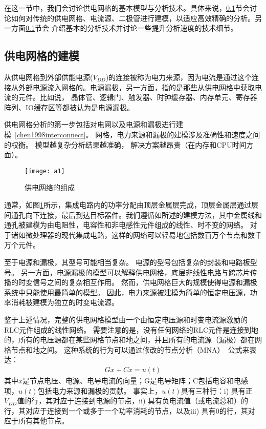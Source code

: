 在这一节中，我们会讨论供电网格的基本模型与分析技术。具体来说，\ref{}节会讨论如何对传统的供电网格、电流源、二极管进行建模，以适应高效精确的分析。另一方面\ref{}节会
介绍基本的分析技术并讨论一些提升分析速度的技术细节。

\subsection{供电网格的建模}


从供电网格到外部供能电源($V_{DD}$)的连接被称为电力来源，因为电流是通过这个连接从外部电源流入网格的。电源漏极，另一方面，指的是那些从供电网格中获取电流的元件。比如说，
晶体管、逻辑门、触发器、时钟缓存器、内存单元、寄存器阵列、IO缓存区等都被认为是电源漏极。

供电网格分析的第一步包括对电网以及电源和漏极进行建模~\ref{chen1998interconnect}。 网格，电力来源和漏极的建模涉及准确性和速度之间的权衡。 模型越复杂分析结果越准确，
解决方案越昂贵（在内存和CPU时间方面）。

\begin{figure}[H] %
  \centering
  \texttt{[image: a1]}
  \caption{供电网络的组成}
  \label{fig:a1}
\end{figure}

通常，如图\ref{fig:a1}所示，集成电路内的功率分配由顶层金属层完成，顶层金属层通过层间通孔向下连接，最后到达目标器件。我们遵循如\cite{chen1998interconnect}所述的建模方法，其中金属线和通孔被建模为由电阻性，电容性和非电感性元件组成的线性、时不变的网络。 对于诸如微处理器的现代集成电路，这样的网络可以轻易地包括数百万个节点和数千万个元件。

至于电源和漏极，其型号可能相当复杂。 电源的型号包括复杂的封装和电路板型号。 另一方面，电源漏极的模型可以解释供电网格，底层非线性电路与跨芯片传播的时变信号之间的复杂相互作用。 然而，供电网格巨大的规模使得电源和漏极系统中只能使用最简单的模型。 因此，电力来源被建模为简单的恒定电压源，功率消耗被建模为独立的时变电流源。

鉴于上述情况，完整的供电网格模型由一个由恒定电压源和时变电流源激励的RLC元件组成的线性网络。 需要注意的是，没有任何网络的RLC元件是连接到地的，所有的电压源都在某些网格节点和地之间，并且所有的电流源（漏极）都在网格节点和地之间。 这种系统的行为可以通过修改的节点分析（MNA）~\cite{pillage1998electronic}公式来表达：
\begin{align}
Gx+C\dot{x}=u(t)
\label{eq:eq1}
\end{align}
其中$x$是节点电压、电源、电导电流的向量；G是电导矩阵；C包括电容和电感项，$u(t)$包括电力来源和漏极的贡献。 事实上，$u(t)$具有三种行：i) 具有正$V_{DD}$值的行，其对应于连接到电源的节点，ii) 具有负电流值（或电流总和）的行，其对应于连接到一个或多于一个功率消耗的节点，以及iii) 具有0的行，其对应于所有其他节点。

